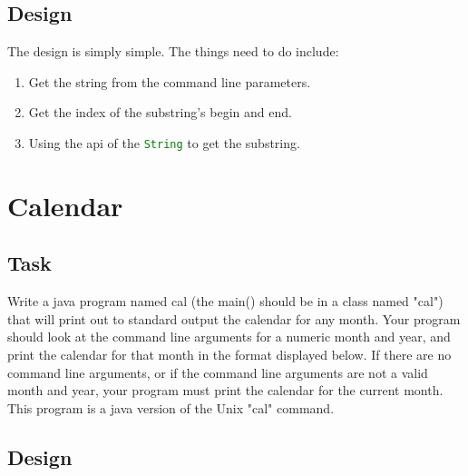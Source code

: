 \documentclass{article}
\begin{document}
\subsection{Design}
\label{sec:sub:design}

The design is simply simple. The things need to do include:

\begin{enumerate}
    \item Get the string from the command line parameters.
    \item Get the index of the substring's begin and end.
    \item Using the api of the \lstinline[language=Java]|String|
        to get the substring.
   \end{enumerate} 


\section{Calendar}
\label{sec:cal}

\subsection{Task}
\label{sec:cal:task}

Write a java program named cal (the main() should be in a class named "cal") that will print out to standard output the calendar for any month.
Your program should look at the command line arguments for a numeric month and year,
and print the calendar for that month in the format displayed below. If there are no command line arguments,
or if the command line arguments are not a valid month and year, your program must print the calendar for the current month.
This program is a java version of the Unix "cal" command.

\subsection{Design}
\end{document}
